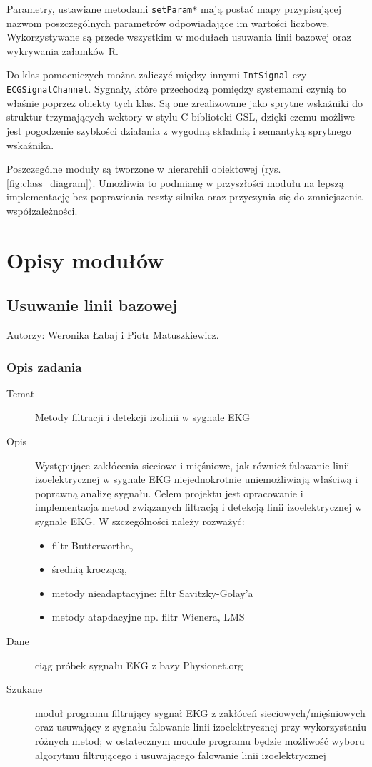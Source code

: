 \documentclass[a4paper, 11pt]{article}
\begin{document}
Parametry, ustawiane metodami \verb+setParam*+ mają postać mapy przypisującej nazwom poszczególnych parametrów odpowiadające im wartości liczbowe. Wykorzystywane są przede wszystkim w modułach usuwania linii bazowej oraz wykrywania załamków R.

Do klas pomocniczych można zaliczyć między innymi \verb+IntSignal+ czy \verb+ECGSignalChannel+. Sygnały, które przechodzą pomiędzy systemami czynią to właśnie poprzez obiekty tych klas. Są one zrealizowane jako sprytne wskaźniki do struktur trzymających wektory w stylu C biblioteki GSL, dzięki czemu możliwe jest pogodzenie szybkości działania z wygodną składnią i semantyką sprytnego wskaźnika.

Poszczególne moduły są tworzone w hierarchii obiektowej (rys. \ref{fig:class_diagram}). Umożliwia to podmianę w przyszłości modułu na lepszą implementację bez poprawiania reszty silnika oraz przyczynia się do zmniejszenia współzależności.

\section{Opisy modułów}
\label{sec:mod}

\subsection{Usuwanie linii bazowej}
\label{sec:baseline}
Autorzy: Weronika Łabaj i Piotr Matuszkiewicz.

\subsubsection{Opis zadania}
\label{sec:baseline:desc}

\begin{description}
\item[Temat] Metody filtracji i detekcji izolinii w sygnale EKG
\item[Opis] Występujące zakłócenia sieciowe i mięśniowe, jak również falowanie linii izoelektrycznej w sygnale EKG niejednokrotnie uniemożliwiają właściwą i poprawną analizę sygnału. Celem projektu jest opracowanie i implementacja metod związanych filtracją i detekcją linii izoelektrycznej w sygnale EKG. W szczególności należy rozważyć:
  \begin{itemize}
  \item filtr Butterwortha,
  \item średnią kroczącą,
  \item metody nieadaptacyjne: filtr Savitzky-Golay’a
  \item metody atapdacyjne np. filtr Wienera, LMS
  \end{itemize}
\item[Dane] ciąg próbek sygnału EKG z bazy Physionet.org
\item[Szukane] moduł programu filtrujący sygnał EKG z zakłóceń sieciowych/mięśniowych oraz usuwający z sygnału falowanie linii izoelektrycznej przy wykorzystaniu różnych metod; w ostatecznym module programu będzie możliwość wyboru algorytmu filtrującego i usuwającego falowanie linii izoelektrycznej
\end{description}
\end{document}
